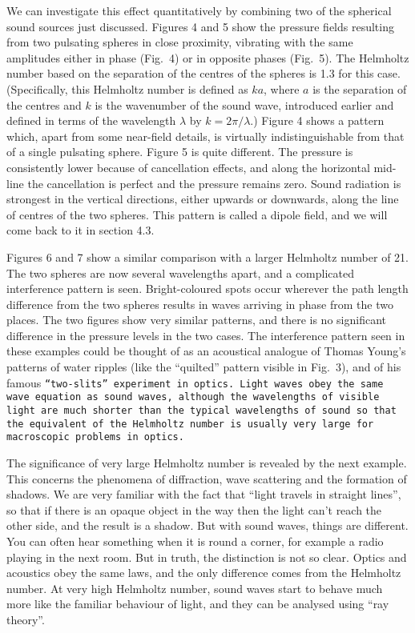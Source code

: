   We can investigate this effect quantitatively by combining two of the 
  spherical sound sources just discussed. Figures 4 and 5 show the pressure 
  fields resulting from two pulsating spheres in close proximity, vibrating 
  with the same amplitudes either in phase (Fig.\ 4) or in opposite phases 
  (Fig.\ 5). The Helmholtz number based on the separation of the centres of the 
  spheres is 1.3 for this case. (Specifically, this Helmholtz number is defined 
  as $ka$, where $a$ is the separation of the centres and $k$ is the wavenumber 
  of the sound wave, introduced earlier and defined in terms of the wavelength 
  $\lambda$ by $k=2 \pi/\lambda$.) Figure 4 shows a pattern which, apart from 
  some near-field details, is virtually indistinguishable from that of a single 
  pulsating sphere. Figure 5 is quite different. The pressure is consistently 
  lower because of cancellation effects, and along the horizontal mid-line the 
  cancellation is perfect and the pressure remains zero. Sound radiation is 
  strongest in the vertical directions, either upwards or downwards, along the 
  line of centres of the two spheres. This pattern is called a dipole field, 
  and we will come back to it in section 4.3. 

  Figures 6 and 7 show a similar comparison with a larger Helmholtz number of 
  21. The two spheres are now several wavelengths apart, and a complicated 
  interference pattern is seen. Bright-coloured spots occur wherever the path 
  length difference from the two spheres results in waves arriving in phase 
  from the two places. The two figures show very similar patterns, and there is 
  no significant difference in the pressure levels in the two cases. The 
  interference pattern seen in these examples could be thought of as an 
  acoustical analogue of Thomas Young's patterns of water ripples (like the 
  ``quilted'' pattern visible in Fig.\ 3), and of his famous \tt{}``two-slits'' 
  experiment\rm{} in optics. Light waves obey the same wave equation as sound 
  waves, although the wavelengths of visible light are much shorter than the 
  typical wavelengths of sound so that the equivalent of the Helmholtz number 
  is usually very large for macroscopic problems in optics. 

  The significance of very large Helmholtz number is revealed by the next 
  example. This concerns the phenomena of diffraction, wave scattering and the 
  formation of shadows. We are very familiar with the fact that ``light travels 
  in straight lines'', so that if there is an opaque object in the way then the 
  light can't reach the other side, and the result is a shadow. But with sound 
  waves, things are different. You can often hear something when it is round a 
  corner, for example a radio playing in the next room. But in truth, the 
  distinction is not so clear. Optics and acoustics obey the same laws, and the 
  only difference comes from the Helmholtz number. At very high Helmholtz 
  number, sound waves start to behave much more like the familiar behaviour of 
  light, and they can be analysed using ``ray theory''. 

